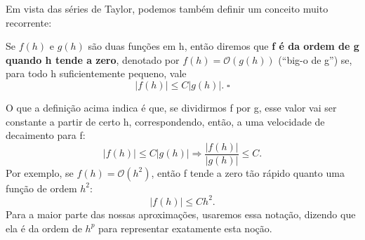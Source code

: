 \documentclass[../differential_methods.tex]{subfiles}
\begin{document}
Em vista das séries de Taylor, podemos também definir um conceito muito recorrente:
\begin{def*}
	Se \(f(h)\) e \(g(h)\) são duas funções em h, então diremos que \textbf{f é da ordem de g quando h tende a zero}, denotado por \(f(h)=\mathcal{O}(g(h))\) (``big-o de g'') se, para todo h suficientemente pequeno, vale
	\[
		| f(h) | \leq C | g(h) |. \; \square
	\]
\end{def*}
\begin{tcolorbox}[
		skin=enhanced,
		title=Observação,
		fonttitle=\bfseries,
		colframe=black,
		colbacktitle=cyan!75!white,
		colback=cyan!15,
		colbacklower=black,
		coltitle=black,
		drop fuzzy shadow,
	]
	O que a definição acima indica é que, se dividirmos f por g, esse valor vai ser constante a partir de certo h, correspondendo, então, a uma velocidade de decaimento para f:
	\[
		| f(h) |\leq C| g(h) | \Rightarrow \frac{| f(h) |}{| g(h) |}\leq C.
	\]
	Por exemplo, se \(f(h)=\mathcal{O}(h^{2})\), então f tende a zero tão rápido quanto uma função de ordem \(h^{2}\):
	\[
		| f(h) |\leq Ch^{2}.
	\]
	Para a maior parte das nossas aproximações, usaremos essa notação, dizendo que ela é da ordem de \(h^{p}\) para representar exatamente esta noção.
\end{tcolorbox}
\end{document}
